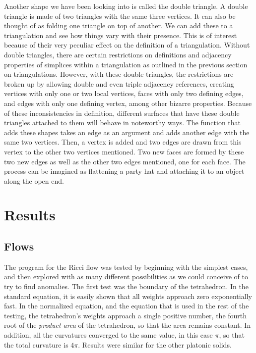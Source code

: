 \documentclass[12pt]{article}
\begin{document}
\begin{itemize}
Another shape we have been looking into is called the double triangle. A double triangle is made of two triangles with the same three vertices. It can also be thought of as folding one triangle on top of another. We can add these to a triangulation and see how things vary with their presence. This is of interest because of their very peculiar effect on the definition of a triangulation. Without double triangles, there are certain restrictions on definitions and adjacency properties of simplices within a triangulation as outlined in the previous section on triangulations. However, with these double triangles, the restrictions are broken up by allowing double and even triple adjacency references, creating vertices with only one or two local vertices, faces with only two defining edges, and edges with only one defining vertex, among other bizarre properties. Because of these inconsistencies in definition, different surfaces that have these double triangles attached to them will behave in noteworthy ways. The function that adds these shapes takes an edge as an argument and adds another edge with the same two vertices. Then, a vertex is added and two edges are drawn from this vertex to the other two vertices mentioned. Two new faces are formed by these two new edges as well as the other two edges mentioned, one for each face. The process can be imagined as flattening a party hat and attaching it to an object along the open end.
\end{itemize}

\section{Results}

\subsection{Flows}

The program for the Ricci flow was tested by beginning with the simplest cases, and then explored with as many different possibilities as we could conceive of to try to find anomalies. The first test was the boundary of the tetrahedron. In the standard equation, it is easily shown that all weights approach zero exponentially fast. In the normalized equation, and the equation that is used in the rest of the testing, the tetrahedron's weights approach a single positive number, the fourth root of the \textit{product area} of the tetrahedron, so that the area remains constant. In addition, all the curvatures converged to the same value, in this case $\pi$, so that the total curvature is $4\pi$. Results were similar for the other platonic solids.\newline
\end{document}
